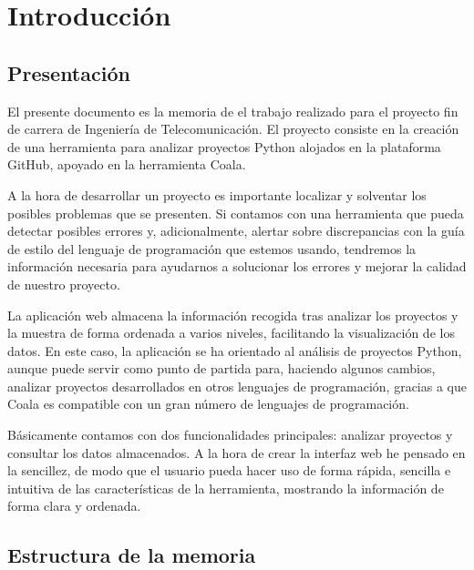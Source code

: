 \documentclass[a4paper, 12pt]{book}
\begin{document}

\cleardoublepage
\chapter{Introducción}
\label{sec:intro} %

\section{Presentación}
\label{sec:presentacion}
El presente documento es la memoria de el trabajo realizado para el proyecto fin de carrera de Ingeniería de Telecomunicación. El proyecto consiste en la creación de una herramienta para analizar proyectos Python alojados en la plataforma GitHub, apoyado en la herramienta Coala.

A la hora de desarrollar un proyecto es importante localizar y solventar los posibles problemas que se presenten. Si contamos con una herramienta que pueda detectar posibles errores y, adicionalmente, alertar sobre discrepancias con la guía de estilo del lenguaje de programación que estemos usando, tendremos la información necesaria para ayudarnos a solucionar los errores y mejorar la calidad de nuestro proyecto.

La aplicación web almacena la información recogida tras analizar los proyectos y la muestra de forma ordenada a varios niveles, facilitando la visualización de los datos. En este caso, la aplicación se ha orientado al análisis de proyectos Python, aunque puede servir como punto de partida para, haciendo algunos cambios, analizar proyectos desarrollados en otros lenguajes de programación, gracias a que Coala es compatible con un gran número de lenguajes de programación.

Básicamente contamos con dos funcionalidades principales: analizar proyectos y consultar los datos almacenados. A la hora de crear la interfaz web he pensado en la sencillez, de modo que el usuario pueda hacer uso de forma rápida, sencilla e intuitiva de las características de la herramienta, mostrando la información de forma clara y ordenada.

\section{Estructura de la memoria}
\label{sec:estructura}
\end{document}
